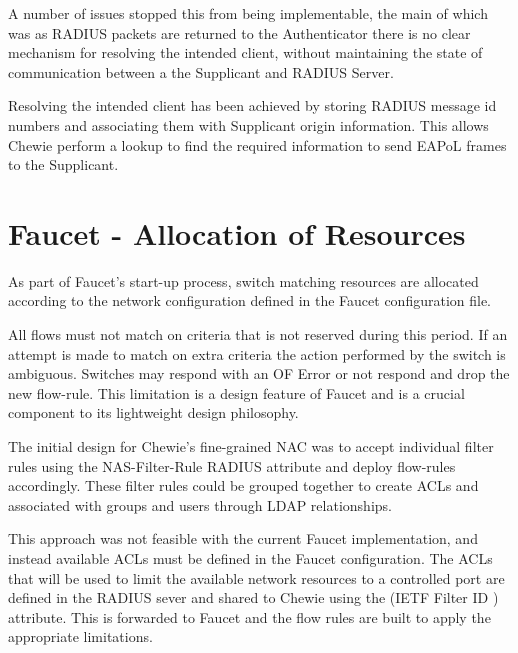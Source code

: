 A number of issues stopped this from being implementable, the main of which was as RADIUS packets are returned to the Authenticator there is no clear mechanism for resolving the intended client, without maintaining the state of communication between a the Supplicant and RADIUS Server. 

Resolving the intended client has been achieved by storing RADIUS message id numbers and associating them with Supplicant origin information. This allows Chewie perform a lookup to find the required information to send EAPoL frames to the Supplicant.

\section{Faucet - Allocation of Resources} \label{section:faucet_resource_allocation}
As part of Faucet's start-up process, switch matching resources are allocated according to the network configuration defined in the Faucet configuration file.

All flows must not match on criteria that is not reserved during this period. If an attempt is made to match on extra criteria the action performed by the switch is ambiguous. Switches may respond with an OF Error or not respond and drop the new flow-rule. This limitation is a design feature of Faucet and is a crucial component to its lightweight design philosophy.

The initial design for Chewie's fine-grained NAC was to accept individual filter rules using the NAS-Filter-Rule RADIUS attribute and deploy flow-rules accordingly. These filter rules could be grouped together to create ACLs and associated with groups and users through LDAP relationships.

This approach was not feasible with the current Faucet implementation, and instead available ACLs must be defined in the Faucet configuration.
The ACLs that will be used to limit the available network resources to a controlled port are defined in the RADIUS sever and shared to Chewie using the (IETF Filter ID ) attribute. This is forwarded to Faucet and the flow rules are built to apply the appropriate limitations.